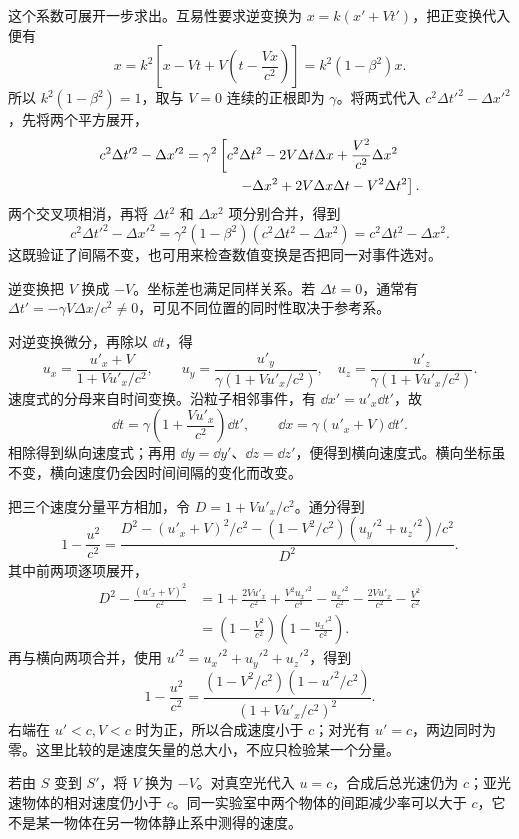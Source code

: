 这个系数可展开一步求出。互易性要求逆变换为 $x=k(x'+Vt')$，把正变换代入便有
\[
x=k^2\left[x-Vt+V\left(t-\frac{Vx}{c^2}\right)\right]
=k^2(1-\beta^2)x.
\]
所以 $k^2(1-\beta^2)=1$，取与 $V=0$ 连续的正根即为 $\gamma$。将两式代入 $c^2\Delta t'^2-\Delta x'^2$，先将两个平方展开，
\begin{align*}
 c^2\Delta t'^2-\Delta x'^2
 &=\gamma^2\left[c^2\Delta t^2-2V\Delta t\Delta x
       +\frac{V^2}{c^2}\Delta x^2\right.\\
 &\hspace{3.8em}\left.-\Delta x^2+2V\Delta x\Delta t-V^2\Delta t^2\right].
\end{align*}
两个交叉项相消，再将 $\Delta t^2$ 和 $\Delta x^2$ 项分别合并，得到
\[
c^2\Delta t'^2-\Delta x'^2
=\gamma^2(1-\beta^2)(c^2\Delta t^2-\Delta x^2)
=c^2\Delta t^2-\Delta x^2.
\]
这既验证了间隔不变，也可用来检查数值变换是否把同一对事件选对。

逆变换把 $V$ 换成 $-V$。坐标差也满足同样关系。若 $\Delta t=0$，通常有 $\Delta t'=-\gamma V\Delta x/c^2\ne0$，可见不同位置的同时性取决于参考系。

对逆变换微分，再除以 $\dd t$，得
\begin{equation}\label{eq:hrvelocity}
u_x=\frac{u'_x+V}{1+Vu'_x/c^2},\qquad
u_y=\frac{u'_y}{\gamma(1+Vu'_x/c^2)},\quad
u_z=\frac{u'_z}{\gamma(1+Vu'_x/c^2)}.
\end{equation}
速度式的分母来自时间变换。沿粒子相邻事件，有 $\dd x'=u'_x\dd t'$，故
\[
\dd t=\gamma\left(1+\frac{Vu'_x}{c^2}\right)\dd t',\qquad
\dd x=\gamma(u'_x+V)\dd t'.
\]
相除得到纵向速度式；再用 $\dd y=\dd y'$、$\dd z=\dd z'$，便得到横向速度式。横向坐标虽不变，横向速度仍会因时间间隔的变化而改变。

把三个速度分量平方相加，令 $D=1+Vu'_x/c^2$。通分得到
\[
 1-\frac{u^2}{c^2}
 =\frac{D^2-(u'_x+V)^2/c^2-(1-V^2/c^2)(u_y'^2+u_z'^2)/c^2}{D^2}.
\]
其中前两项逐项展开，
\begin{align*}
 D^2-\frac{(u'_x+V)^2}{c^2}
 &=1+\frac{2Vu'_x}{c^2}+\frac{V^2u_x'^2}{c^4}
   -\frac{u_x'^2}{c^2}-\frac{2Vu'_x}{c^2}-\frac{V^2}{c^2}\\
 &=\left(1-\frac{V^2}{c^2}\right)\left(1-\frac{u_x'^2}{c^2}\right).
\end{align*}
再与横向两项合并，使用 $u'^2=u_x'^2+u_y'^2+u_z'^2$，得到
\[
1-\frac{u^2}{c^2}
=\frac{(1-V^2/c^2)(1-u'^2/c^2)}{(1+Vu'_x/c^2)^2}.
\]
右端在 $u'<c,V<c$ 时为正，所以合成速度小于 $c$；对光有 $u'=c$，两边同时为零。这里比较的是速度矢量的总大小，不应只检验某一个分量。

若由 $S$ 变到 $S'$，将 $V$ 换为 $-V$。对真空光代入 $u=c$，合成后总光速仍为 $c$；亚光速物体的相对速度仍小于 $c$。同一实验室中两个物体的间距减少率可以大于 $c$，它不是某一物体在另一物体静止系中测得的速度。

